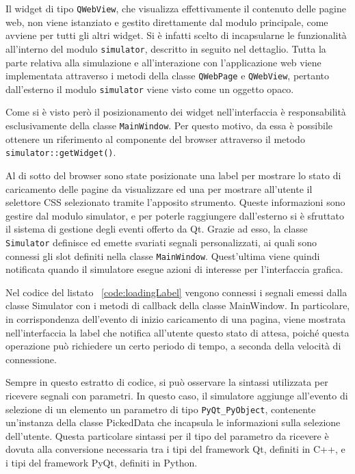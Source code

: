 Il widget di tipo \verb|QWebView|, che visualizza effettivamente il contenuto delle pagine web, non viene istanziato e gestito direttamente dal modulo principale, come avviene per tutti gli altri widget. Si è infatti scelto di incapsularne le funzionalità all'interno del modulo \verb|simulator|, descritto in seguito nel dettaglio. Tutta la parte relativa alla simulazione e all'interazione con l'applicazione web viene implementata attraverso i metodi della classe \verb|QWebPage| e \verb|QWebView|, pertanto dall'esterno il modulo \verb|simulator| viene visto come un oggetto opaco. 

Come si è visto però il posizionamento dei widget nell'interfaccia è responsabilità esclusivamente della classe \verb|MainWindow|. Per questo motivo, da essa è possibile ottenere un riferimento al componente del browser attraverso il metodo \verb|simulator::getWidget()|.

Al di sotto del browser sono state posizionate una label per mostrare lo stato di caricamento delle pagine da visualizzare ed una per mostrare all'utente il selettore CSS selezionato tramite l'apposito strumento. Queste informazioni sono gestire dal modulo simulator, e per poterle raggiungere dall'esterno si è sfruttato il sistema di gestione degli eventi offerto da Qt. Grazie ad esso, la classe \verb|Simulator| definisce ed emette svariati segnali personalizzati, ai quali sono connessi gli slot definiti nella classe \verb|MainWindow|. Quest'ultima viene quindi notificata quando il simulatore esegue azioni di interesse per l'interfaccia grafica.



Nel codice del listato ~\ref{code:loadingLabel} vengono connessi i segnali emessi dalla classe Simulator con i metodi di callback della classe MainWindow. In particolare, in corrispondenza dell'evento di inizio caricamento di una pagina, viene mostrata nell'interfaccia la label che notifica all'utente questo stato di attesa, poiché questa operazione può richiedere un certo periodo di tempo, a seconda della velocità di connessione.  

Sempre in questo estratto di codice, si può osservare la sintassi utilizzata per ricevere segnali con parametri. In questo caso, il simulatore aggiunge all'evento di selezione di un elemento un parametro di tipo \verb|PyQt_PyObject|, contenente un'instanza della classe PickedData che incapsula le informazioni sulla selezione dell'utente. Questa particolare sintassi per il tipo del parametro da ricevere è dovuta alla conversione necessaria tra i tipi del framework Qt, definiti in C++, e i tipi del framework PyQt, definiti in Python. 

